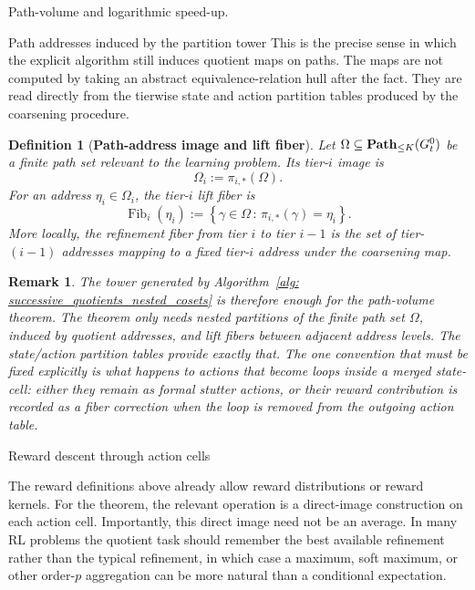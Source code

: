 \documentclass[11pt]{article}
\newtheorem{definition}[subsubsection]{Definition}
\newtheorem{remark}[subsubsection]{Remark}
\newcommand{\fiber}{\operatorname{Fib}}
\begin{document}
\begin{section}{Path-volume and logarithmic speed-up.}
\begin{subsection}{Path addresses induced by the partition tower}
This is the precise sense in which the explicit algorithm still induces quotient maps on paths. The maps are not computed by taking an abstract equivalence-relation hull after the fact. They are read directly from the tierwise state and action partition tables produced by the coarsening procedure.

\begin{definition}[{\bf Path-address image and lift fiber}]\label{def:path-address-image}
\normalfont
Let
$
\Omega\subseteq\bold{Path}_{\le K}(G_t^0)
$
be a finite path set relevant to the learning problem. Its tier-$i$ image is
$$
\Omega_i:=\pi_{i,*}(\Omega).
$$
For an address $\eta_i\in\Omega_i$, the tier-$i$ lift fiber is
$$
\fiber_i(\eta_i)
:=
\left\{
\gamma\in\Omega
\,:\,
\pi_{i,*}(\gamma)=\eta_i
\right\}.
$$
More locally, the refinement fiber from tier $i$ to tier $i-1$ is the set of tier-$(i-1)$ addresses mapping to a fixed tier-$i$ address under the coarsening map.
\end{definition}

\begin{remark}
\normalfont
The tower generated by Algorithm~\ref{alg: successive_quotients_nested_cosets} is therefore enough for the path-volume theorem. The theorem only needs nested partitions of the finite path set $\Omega$, induced by quotient addresses, and lift fibers between adjacent address levels. The state/action partition tables provide exactly that. The one convention that must be fixed explicitly is what happens to actions that become loops inside a merged state-cell: either they remain as formal stutter actions, or their reward contribution is recorded as a fiber correction when the loop is removed from the outgoing action table.
\end{remark}

\end{subsection}

\begin{subsection}{Reward descent through action cells}

The reward definitions above already allow reward distributions or reward kernels. For the theorem, the relevant operation is a direct-image construction on each action cell. Importantly, this direct image need not be an average. In many RL problems the quotient task should remember the best available refinement rather than the typical refinement, in which case a maximum, soft maximum, or other order-$p$ aggregation can be more natural than a conditional expectation.


\end{subsection}
\end{section}
\end{document}
